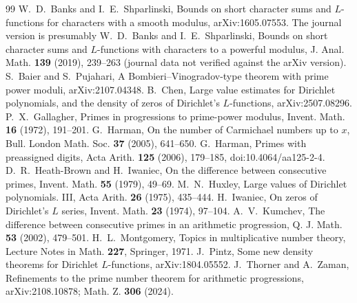 \documentclass[11pt]{amsart}
\theoremstyle{definition}
\numberwithin{equation}{section}
\begin{document}
\begin{thebibliography}{99}
 W.~D.~Banks and I.~E.~Shparlinski, Bounds on short character sums and $L$-functions for characters with a smooth modulus, arXiv:1605.07553. The journal version is presumably W.~D.~Banks and I.~E.~Shparlinski, Bounds on short character sums and $L$-functions with characters to a powerful modulus, J. Anal. Math. \textbf{139} (2019), 239--263 (journal data not verified against the arXiv version).
 S.~Baier and S.~Pujahari, A Bombieri--Vinogradov-type theorem with prime power moduli, arXiv:2107.04348.
 B.~Chen, Large value estimates for Dirichlet polynomials, and the density of zeros of Dirichlet's $L$-functions, arXiv:2507.08296.
 P.~X.~Gallagher, Primes in progressions to prime-power modulus, Invent. Math. \textbf{16} (1972), 191--201.
 G.~Harman, On the number of Carmichael numbers up to $x$, Bull. London Math. Soc. \textbf{37} (2005), 641--650.
 G.~Harman, Primes with preassigned digits, Acta Arith. \textbf{125} (2006), 179--185, doi:10.4064/aa125-2-4.
 D.~R.~Heath-Brown and H.~Iwaniec, On the difference between consecutive primes, Invent. Math. \textbf{55} (1979), 49--69.
 M.~N.~Huxley, Large values of Dirichlet polynomials. III, Acta Arith. \textbf{26} (1975), 435--444.
 H.~Iwaniec, On zeros of Dirichlet's $L$ series, Invent. Math. \textbf{23} (1974), 97--104.
 A.~V.~Kumchev, The difference between consecutive primes in an arithmetic progression, Q. J. Math. \textbf{53} (2002), 479--501.
 H.~L.~Montgomery, Topics in multiplicative number theory, Lecture Notes in Math. \textbf{227}, Springer, 1971.
 J.~Pintz, Some new density theorems for Dirichlet $L$-functions, arXiv:1804.05552.
 J.~Thorner and A.~Zaman, Refinements to the prime number theorem for arithmetic progressions, arXiv:2108.10878; Math. Z. \textbf{306} (2024).
\end{thebibliography}
\end{document}
